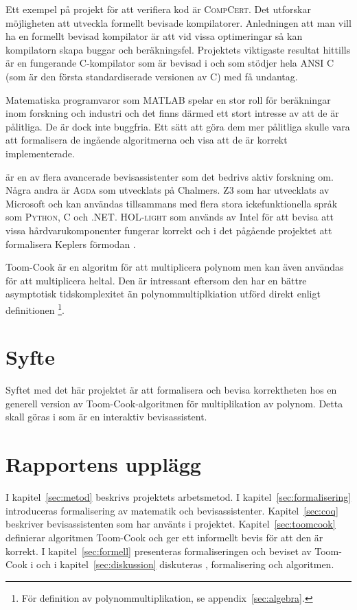 Ett exempel på projekt för att verifiera kod är \textsc{CompCert}. Det
utforskar möjligheten att utveckla formellt bevisade kompilatorer. Anledningen
att man vill ha en formellt bevisad kompilator är att vid vissa optimeringar så
kan kompilatorn skapa buggar och beräkningsfel. Projektets viktigaste resultat
hittills är en fungerande C-kompilator som är bevisad i \coq{} och som stödjer
hela \textsc{ANSI C} (som är den första standardiserade versionen av
\textsc{C}) med få undantag\cite{compcert}.

Matematiska programvaror som \textsc{MATLAB} spelar en stor roll för
beräkningar inom forskning och industri och det finns därmed ett stort intresse
av att de är pålitliga. De är dock inte buggfria. Ett sätt att göra dem mer
pålitliga skulle vara att formalisera de ingående algoritmerna och visa att de
är korrekt implementerade\cite{denes2012refinement}.

\coq{} är en av flera avancerade bevisassistenter som det bedrivs aktiv
forskning om. Några andra är \textsc{Agda} som utvecklats på Chalmers.
\textsc{Z3} som har utvecklats av Microsoft och kan användas tillsammans med
flera stora ickefunktionella språk som \textsc{Python}, \textsc{C} och
\textsc{.NET}. \textsc{HOL-light} som används av Intel för att bevisa att vissa
hårdvarukomponenter fungerar korrekt och i det pågående projektet att
formalisera Keplers förmodan \cite{hales2008formal}.

Toom-Cook är en algoritm för att multiplicera polynom men kan även användas
för att multiplicera heltal. Den är intressant eftersom den har en bättre
asymptotisk tidskomplexitet än polynommultiplkiation utförd direkt enligt
definitionen \footnote{För definition av polynommultiplikation, se
appendix~\ref{sec:algebra}.}.

\section{Syfte}
Syftet med det här projektet är att formalisera och bevisa korrektheten hos en
generell version av Toom-Cook-algoritmen för multiplikation av polynom. Detta
skall göras i \coq som är en interaktiv bevisassistent.

\section{Rapportens upplägg}
I kapitel~\ref{sec:metod} beskrivs projektets arbetsmetod. I
kapitel~\ref{sec:formalisering} introduceras formalisering av matematik och
bevisassistenter. Kapitel~\ref{sec:coq} beskriver bevisassistenten \coq{} som har
använts i projektet. Kapitel~\ref{sec:toomcook} definierar algoritmen Toom-Cook och
ger ett informellt bevis för att den är korrekt. I kapitel~\ref{sec:formell}
presenteras formaliseringen och beviset av Toom-Cook i \coq{} och i
kapitel~\ref{sec:diskussion} diskuteras \coq{}, formalisering och algoritmen.

